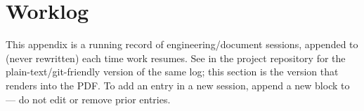 \clearpage
\appendix
\section{Worklog}
\label{sec:worklog}

\small
This appendix is a running record of engineering/document sessions, appended to (never rewritten) each time work resumes. See  in the project repository for the plain-text/git-friendly version of the same log; this section is the version that renders into the PDF. To add an entry in a new session, append a new  block to  --- do not edit or remove prior entries.
\normalsize


